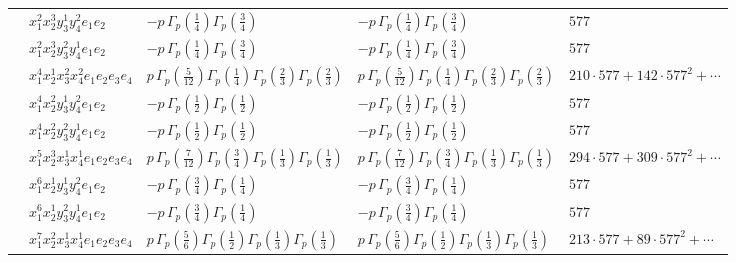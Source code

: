 \documentclass[11pt]{article}
\begin{document}
\begin{table}[ht]
{\begin{tabular}{@{}lllll@{}}
 & $x_{1}^{2} x_{2}^{3} y_{3}^{1} y_{4}^{2} e_{1} e_{2}$ & $- p \, \Gamma_p \left( \frac{1}{4} \right) \Gamma_p \left( \frac{3}{4} \right)$ & $- p \, \Gamma_p \left( \frac{1}{4} \right) \Gamma_p \left( \frac{3}{4} \right)$ & $577$ \\
 & $x_{1}^{2} x_{2}^{3} y_{3}^{2} y_{4}^{1} e_{1} e_{2}$ & $- p \, \Gamma_p \left( \frac{1}{4} \right) \Gamma_p \left( \frac{3}{4} \right)$ & $- p \, \Gamma_p \left( \frac{1}{4} \right) \Gamma_p \left( \frac{3}{4} \right)$ & $577$ \\
 & $x_{1}^{4} x_{2}^{1} x_{3}^{2} x_{4}^{2}  e_{1} e_{2} e_{3} e_{4}$ & $p \, \Gamma_p \left( \frac{5}{12} \right) \Gamma_p \left( \frac{1}{4} \right) \Gamma_p \left( \frac{2}{3} \right) \Gamma_p \left( \frac{2}{3} \right)$ & $p \, \Gamma_p \left( \frac{5}{12} \right) \Gamma_p \left( \frac{1}{4} \right) \Gamma_p \left( \frac{2}{3} \right) \Gamma_p \left( \frac{2}{3} \right)$ & $210{\cdot}577{+}142{\cdot}577^{2}{+}\cdots$ \\
 & $x_{1}^{4} x_{2}^{2} y_{3}^{1} y_{4}^{2} e_{1} e_{2}$ & $- p \, \Gamma_p \left( \frac{1}{2} \right) \Gamma_p \left( \frac{1}{2} \right)$ & $- p \, \Gamma_p \left( \frac{1}{2} \right) \Gamma_p \left( \frac{1}{2} \right)$ & $577$ \\
 & $x_{1}^{4} x_{2}^{2} y_{3}^{2} y_{4}^{1} e_{1} e_{2}$ & $- p \, \Gamma_p \left( \frac{1}{2} \right) \Gamma_p \left( \frac{1}{2} \right)$ & $- p \, \Gamma_p \left( \frac{1}{2} \right) \Gamma_p \left( \frac{1}{2} \right)$ & $577$ \\
 & $x_{1}^{5} x_{2}^{3} x_{3}^{1} x_{4}^{1}  e_{1} e_{2} e_{3} e_{4}$ & $p \, \Gamma_p \left( \frac{7}{12} \right) \Gamma_p \left( \frac{3}{4} \right) \Gamma_p \left( \frac{1}{3} \right) \Gamma_p \left( \frac{1}{3} \right)$ & $p \, \Gamma_p \left( \frac{7}{12} \right) \Gamma_p \left( \frac{3}{4} \right) \Gamma_p \left( \frac{1}{3} \right) \Gamma_p \left( \frac{1}{3} \right)$ & $294{\cdot}577{+}309{\cdot}577^{2}{+}\cdots$ \\
 & $x_{1}^{6} x_{2}^{1} y_{3}^{1} y_{4}^{2} e_{1} e_{2}$ & $- p \, \Gamma_p \left( \frac{3}{4} \right) \Gamma_p \left( \frac{1}{4} \right)$ & $- p \, \Gamma_p \left( \frac{3}{4} \right) \Gamma_p \left( \frac{1}{4} \right)$ & $577$ \\
 & $x_{1}^{6} x_{2}^{1} y_{3}^{2} y_{4}^{1} e_{1} e_{2}$ & $- p \, \Gamma_p \left( \frac{3}{4} \right) \Gamma_p \left( \frac{1}{4} \right)$ & $- p \, \Gamma_p \left( \frac{3}{4} \right) \Gamma_p \left( \frac{1}{4} \right)$ & $577$ \\
 & $x_{1}^{7} x_{2}^{2} x_{3}^{1} x_{4}^{1}  e_{1} e_{2} e_{3} e_{4}$ & $p \, \Gamma_p \left( \frac{5}{6} \right) \Gamma_p \left( \frac{1}{2} \right) \Gamma_p \left( \frac{1}{3} \right) \Gamma_p \left( \frac{1}{3} \right)$ & $p \, \Gamma_p \left( \frac{5}{6} \right) \Gamma_p \left( \frac{1}{2} \right) \Gamma_p \left( \frac{1}{3} \right) \Gamma_p \left( \frac{1}{3} \right)$ & $213{\cdot}577{+}89{\cdot}577^{2}{+}\cdots$ \\

\end{tabular}}
\end{table}
\end{document}
